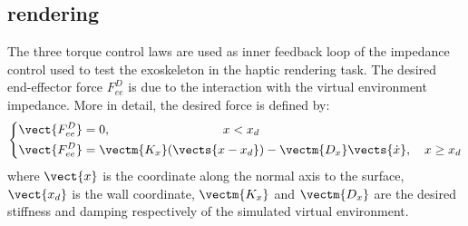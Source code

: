 \subsection{\DIFdelbegin {}\DIFdelend \DIFaddbegin {}\DIFaddend rendering} \label{sub:impedanceCJICF}

The three torque control laws are used as inner feedback loop of the impedance control used to test the exoskeleton in the haptic rendering task. The desired end-effector force $F_{ee}^D$ is due to the interaction with the virtual environment impedance. More in detail, the desired force is defined by:
%
\begin{equation}
\label{eq:desiredVE}
\left \{
\begin{aligned}
& \vect{ F_{ee}^D} = 0, \ \ \ \quad \quad \quad \quad \quad \quad \quad \quad  x < x_d \\
& \vect{F_{ee}^D} = \vectm{K_x} (\vects{x - x_d}) - \vectm{D_x}\vects{\dot{x}}, \quad  x \geq x_d  \\
\end{aligned}
\right .
\end{equation}
%
%
%
where $\vect{x}$ is the coordinate along the normal axis to the surface, $\vect{x_d}$   is the wall coordinate, $\vectm{K_x}$ and $\vectm{D_x}$ are the desired stiffness and damping respectively of the simulated virtual environment.

\DIFdelbegin %

\DIFdelend

